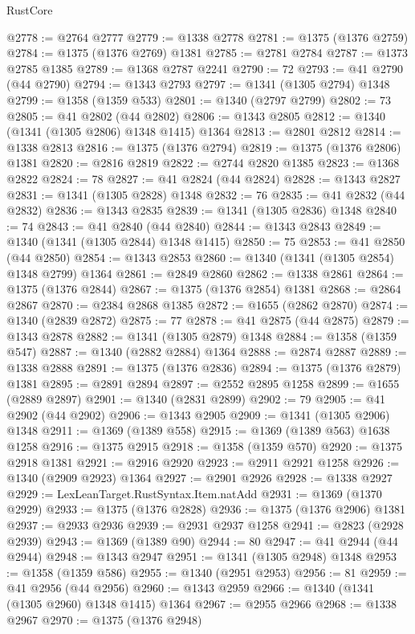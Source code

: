 \begin{lexlean}{RustCore}
\begin{coremodule}
@2778 := @2764 @2777
@2779 := @1338 @2778
@2781 := @1375 (@1376 @2759)
@2784 := @1375 (@1376 @2769) @1381
@2785 := @2781 @2784
@2787 := @1373 @2785 @1385
@2789 := @1368 @2787 @2241
@2790 := 72
@2793 := @41 @2790 (@44 @2790)
@2794 := @1343 @2793
@2797 := @1341 (@1305 @2794) @1348
@2799 := @1358 (@1359 @533)
@2801 := @1340 (@2797 @2799)
@2802 := 73
@2805 := @41 @2802 (@44 @2802)
@2806 := @1343 @2805
@2812 := @1340 (@1341 (@1305 @2806) @1348 @1415) @1364
@2813 := @2801 @2812
@2814 := @1338 @2813
@2816 := @1375 (@1376 @2794)
@2819 := @1375 (@1376 @2806) @1381
@2820 := @2816 @2819
@2822 := @2744 @2820 @1385
@2823 := @1368 @2822
@2824 := 78
@2827 := @41 @2824 (@44 @2824)
@2828 := @1343 @2827
@2831 := @1341 (@1305 @2828) @1348
@2832 := 76
@2835 := @41 @2832 (@44 @2832)
@2836 := @1343 @2835
@2839 := @1341 (@1305 @2836) @1348
@2840 := 74
@2843 := @41 @2840 (@44 @2840)
@2844 := @1343 @2843
@2849 := @1340 (@1341 (@1305 @2844) @1348 @1415)
@2850 := 75
@2853 := @41 @2850 (@44 @2850)
@2854 := @1343 @2853
@2860 := @1340 (@1341 (@1305 @2854) @1348 @2799) @1364
@2861 := @2849 @2860
@2862 := @1338 @2861
@2864 := @1375 (@1376 @2844)
@2867 := @1375 (@1376 @2854) @1381
@2868 := @2864 @2867
@2870 := @2384 @2868 @1385
@2872 := @1655 (@2862 @2870)
@2874 := @1340 (@2839 @2872)
@2875 := 77
@2878 := @41 @2875 (@44 @2875)
@2879 := @1343 @2878
@2882 := @1341 (@1305 @2879) @1348
@2884 := @1358 (@1359 @547)
@2887 := @1340 (@2882 @2884) @1364
@2888 := @2874 @2887
@2889 := @1338 @2888
@2891 := @1375 (@1376 @2836)
@2894 := @1375 (@1376 @2879) @1381
@2895 := @2891 @2894
@2897 := @2552 @2895 @1258
@2899 := @1655 (@2889 @2897)
@2901 := @1340 (@2831 @2899)
@2902 := 79
@2905 := @41 @2902 (@44 @2902)
@2906 := @1343 @2905
@2909 := @1341 (@1305 @2906) @1348
@2911 := @1369 (@1389 @558)
@2915 := @1369 (@1389 @563) @1638 @1258
@2916 := @1375 @2915
@2918 := @1358 (@1359 @570)
@2920 := @1375 @2918 @1381
@2921 := @2916 @2920
@2923 := @2911 @2921 @1258
@2926 := @1340 (@2909 @2923) @1364
@2927 := @2901 @2926
@2928 := @1338 @2927
@2929 := LexLeanTarget.RustSyntax.Item.natAdd
@2931 := @1369 (@1370 @2929)
@2933 := @1375 (@1376 @2828)
@2936 := @1375 (@1376 @2906) @1381
@2937 := @2933 @2936
@2939 := @2931 @2937 @1258
@2941 := @2823 (@2928 @2939)
@2943 := @1369 (@1389 @90)
@2944 := 80
@2947 := @41 @2944 (@44 @2944)
@2948 := @1343 @2947
@2951 := @1341 (@1305 @2948) @1348
@2953 := @1358 (@1359 @586)
@2955 := @1340 (@2951 @2953)
@2956 := 81
@2959 := @41 @2956 (@44 @2956)
@2960 := @1343 @2959
@2966 := @1340 (@1341 (@1305 @2960) @1348 @1415) @1364
@2967 := @2955 @2966
@2968 := @1338 @2967
@2970 := @1375 (@1376 @2948)

\end{coremodule}
\end{lexlean}
